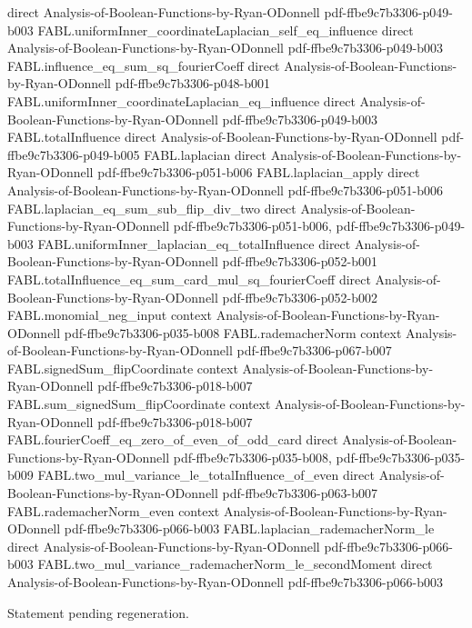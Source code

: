 \begin{theorem}
  {direct}
  {Analysis-of-Boolean-Functions-by-Ryan-ODonnell}
  {pdf-ffbe9c7b3306-p049-b003}
\proofstep
  {FABL.uniformInner_coordinateLaplacian_self_eq_influence}
  {direct}
  {Analysis-of-Boolean-Functions-by-Ryan-ODonnell}
  {pdf-ffbe9c7b3306-p049-b003}
\proofstep
  {FABL.influence_eq_sum_sq_fourierCoeff}
  {direct}
  {Analysis-of-Boolean-Functions-by-Ryan-ODonnell}
  {pdf-ffbe9c7b3306-p048-b001}
\proofstep
  {FABL.uniformInner_coordinateLaplacian_eq_influence}
  {direct}
  {Analysis-of-Boolean-Functions-by-Ryan-ODonnell}
  {pdf-ffbe9c7b3306-p049-b003}
\proofstep
  {FABL.totalInfluence}
  {direct}
  {Analysis-of-Boolean-Functions-by-Ryan-ODonnell}
  {pdf-ffbe9c7b3306-p049-b005}
\proofstep
  {FABL.laplacian}
  {direct}
  {Analysis-of-Boolean-Functions-by-Ryan-ODonnell}
  {pdf-ffbe9c7b3306-p051-b006}
\proofstep
  {FABL.laplacian_apply}
  {direct}
  {Analysis-of-Boolean-Functions-by-Ryan-ODonnell}
  {pdf-ffbe9c7b3306-p051-b006}
\proofstep
  {FABL.laplacian_eq_sum_sub_flip_div_two}
  {direct}
  {Analysis-of-Boolean-Functions-by-Ryan-ODonnell}
  {pdf-ffbe9c7b3306-p051-b006,
    pdf-ffbe9c7b3306-p049-b003}
\proofstep
  {FABL.uniformInner_laplacian_eq_totalInfluence}
  {direct}
  {Analysis-of-Boolean-Functions-by-Ryan-ODonnell}
  {pdf-ffbe9c7b3306-p052-b001}
\proofstep
  {FABL.totalInfluence_eq_sum_card_mul_sq_fourierCoeff}
  {direct}
  {Analysis-of-Boolean-Functions-by-Ryan-ODonnell}
  {pdf-ffbe9c7b3306-p052-b002}
\proofstep
  {FABL.monomial_neg_input}
  {context}
  {Analysis-of-Boolean-Functions-by-Ryan-ODonnell}
  {pdf-ffbe9c7b3306-p035-b008}
\proofstep
  {FABL.rademacherNorm}
  {context}
  {Analysis-of-Boolean-Functions-by-Ryan-ODonnell}
  {pdf-ffbe9c7b3306-p067-b007}
\proofstep
  {FABL.signedSum_flipCoordinate}
  {context}
  {Analysis-of-Boolean-Functions-by-Ryan-ODonnell}
  {pdf-ffbe9c7b3306-p018-b007}
\proofstep
  {FABL.sum_signedSum_flipCoordinate}
  {context}
  {Analysis-of-Boolean-Functions-by-Ryan-ODonnell}
  {pdf-ffbe9c7b3306-p018-b007}
\proofstep
  {FABL.fourierCoeff_eq_zero_of_even_of_odd_card}
  {direct}
  {Analysis-of-Boolean-Functions-by-Ryan-ODonnell}
  {pdf-ffbe9c7b3306-p035-b008,
    pdf-ffbe9c7b3306-p035-b009}
\proofstep
  {FABL.two_mul_variance_le_totalInfluence_of_even}
  {direct}
  {Analysis-of-Boolean-Functions-by-Ryan-ODonnell}
  {pdf-ffbe9c7b3306-p063-b007}
\proofstep
  {FABL.rademacherNorm_even}
  {context}
  {Analysis-of-Boolean-Functions-by-Ryan-ODonnell}
  {pdf-ffbe9c7b3306-p066-b003}
\proofstep
  {FABL.laplacian_rademacherNorm_le}
  {direct}
  {Analysis-of-Boolean-Functions-by-Ryan-ODonnell}
  {pdf-ffbe9c7b3306-p066-b003}
\proofstep
  {FABL.two_mul_variance_rademacherNorm_le_secondMoment}
  {direct}
  {Analysis-of-Boolean-Functions-by-Ryan-ODonnell}
  {pdf-ffbe9c7b3306-p066-b003}

Statement pending regeneration.
\end{theorem}

